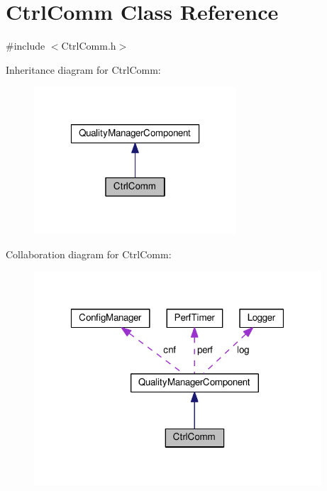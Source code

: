 \hypertarget{classCtrlComm}{}\section{Ctrl\+Comm Class Reference}
\label{classCtrlComm}


{\ttfamily \#include $<$Ctrl\+Comm.\+h$>$}



Inheritance diagram for Ctrl\+Comm\+:
\nopagebreak
\begin{figure}[H]
\begin{center}
\leavevmode
\includegraphics[width=214pt]{classCtrlComm__inherit__graph}
\end{center}
\end{figure}


Collaboration diagram for Ctrl\+Comm\+:
\nopagebreak
\begin{figure}[H]
\begin{center}
\leavevmode
\includegraphics[width=304pt]{classCtrlComm__coll__graph}
\end{center}
\end{figure}
